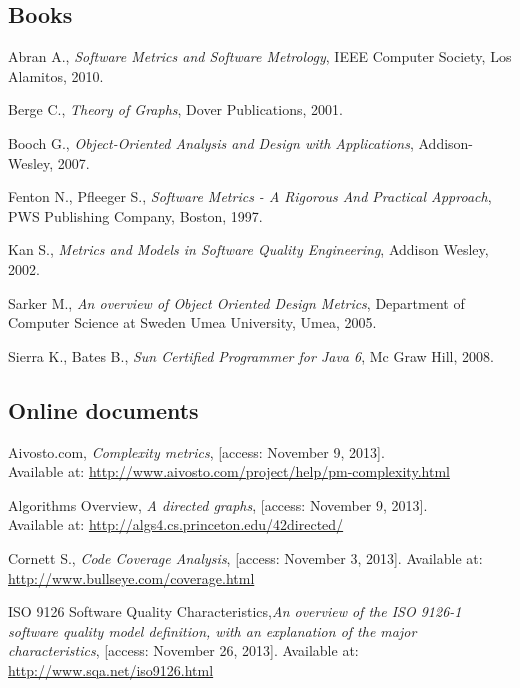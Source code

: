 \begin{thebibliography}{100}

\subsection*{Books}

	 Abran A., {\em Software Metrics and Software Metrology}, IEEE Computer Society, Los Alamitos, 2010.	
	
	 Berge C., {\em Theory of Graphs}, Dover Publications, 2001. 
	
	 Booch G., {\em Object-Oriented Analysis and Design with Applications}, Addison-Wesley, 2007.
	
	 Fenton N., Pfleeger S., {\em Software Metrics - A Rigorous And Practical Approach}, PWS Publishing Company, Boston, 1997.
	
	 Kan S., {\em Metrics and Models in Software Quality Engineering}, Addison Wesley, 2002.

	 Sarker M., {\em An overview of Object Oriented Design Metrics}, Department of Computer Science at Sweden Umea University, Umea, 2005.
		
	 Sierra K., Bates B., {\em Sun Certified Programmer for Java 6}, Mc Graw Hill, 2008.
	
\subsection*{Online documents}

	 Aivosto.com, {\em Complexity metrics}, [access: November 9, 2013]. \\ Available at: \url{http://www.aivosto.com/project/help/pm-complexity.html} 
	
	 Algorithms Overview, {\em A directed graphs}, [access: November 9, 2013].\\  Available at: \url{http://algs4.cs.princeton.edu/42directed/}

	 Cornett S., {\em Code Coverage Analysis}, [access: November 3, 2013]. Available at: \url{http://www.bullseye.com/coverage.html}

	 ISO 9126 Software Quality Characteristics,{\em An overview of the ISO 9126-1 software quality model definition, with an explanation of the major characteristics}, [access: November 26, 2013]. Available at: \url{http://www.sqa.net/iso9126.html}


\end{thebibliography}
